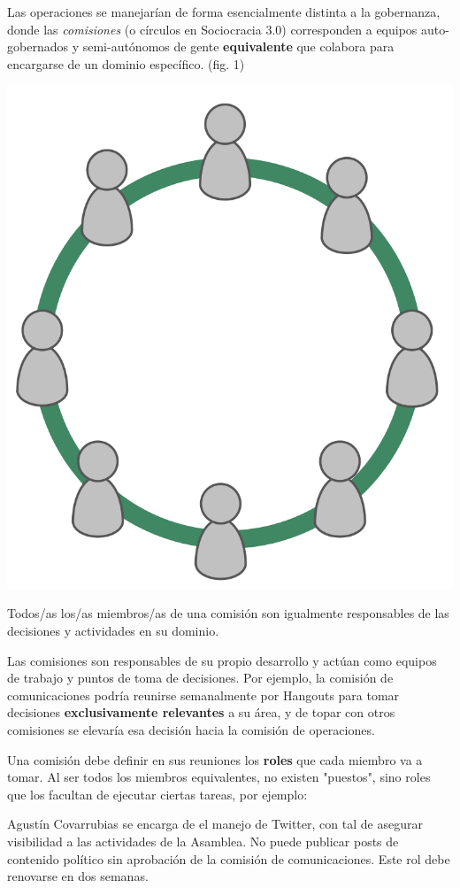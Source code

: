 \documentclass[justified]{tufte-handout} %
\begin{document}
Las operaciones se manejarían de forma esencialmente distinta a la gobernanza, donde las \textit{comisiones} (o círculos en Sociocracia 3.0) corresponden a equipos auto-gobernados y semi-autónomos de gente \textbf{equivalente} que colabora para encargarse de un dominio específico. (fig. 1)
\begin{marginfigure}[-45px]
	\includegraphics[width=\linewidth]{circulo.png}
	\caption{Todos/as los/as miembros/as de una comisión son igualmente responsables de las decisiones y actividades en su dominio.}
	\label{fig:circulo}
\end{marginfigure}

Las comisiones son responsables de su propio desarrollo y actúan como equipos de trabajo y puntos de toma de decisiones. Por ejemplo, la comisión de comunicaciones podría reunirse semanalmente por Hangouts para tomar decisiones \textbf{exclusivamente relevantes} a su área, y de topar con otros comisiones se elevaría esa decisión hacia la comisión de operaciones.

Una comisión debe definir en sus reuniones los \textbf{roles} que cada miembro va a tomar. Al ser todos los miembros equivalentes, no existen "puestos", sino roles que los facultan de ejecutar ciertas tareas, por ejemplo:
\begin{displayquote}
	Agustín Covarrubias se encarga de el manejo de Twitter, con tal de asegurar visibilidad a las actividades de la Asamblea. No puede publicar posts de contenido político sin aprobación de la comisión de comunicaciones. Este rol debe renovarse en dos semanas.
\end{displayquote}
\end{document}
